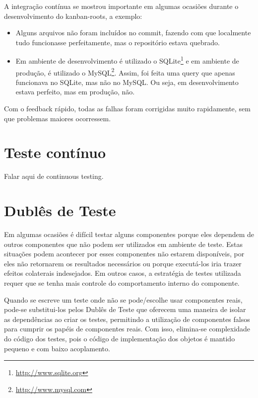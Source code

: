 A integração contínua se mostrou importante em algumas ocasiões durante o desenvolvimento do kanban-roots, a exemplo:

\begin{itemize}
  \item Alguns arquivos não foram incluídos no commit, fazendo com que localmente tudo funcionasse perfeitamente, mas o repositório estava quebrado.
  \item Em ambiente de desenvolvimento é utilizado o SQLite\footnote{\url{http://www.sqlite.org}} e em ambiente de produção, é utilizado o MySQL\footnote{\url{http://www.mysql.com}}. Assim, foi feita uma query que apenas funcionava no SQLite, mas não no MySQL. Ou seja, em desenvolvimento estava perfeito, mas em produção, não.
\end{itemize}

Com o feedback rápido, todas as falhas foram corrigidas muito rapidamente, sem que problemas maiores ocorressem.



\section{Teste contínuo}
\label{sub:teste_continuo}

Falar aqui de continuous testing.

\section{Dublês de Teste}

Em algumas ocasiões é difícil testar alguns componentes porque eles dependem de outros componentes que não podem ser utilizados em ambiente de teste. Estas situações podem acontecer por esses componentes não estarem disponíveis, por eles não retornarem os resultados necessários ou porque executá-los iria trazer efeitos colaterais indesejados. Em outros casos, a estratégia de testes utilizada requer que se tenha mais controle do comportamento interno do componente.

Quando se escreve um teste onde não se pode/escolhe usar componentes reais, pode-se substitui-los pelos Dublês de Teste que oferecem uma maneira de isolar as dependências ao criar os testes, permitindo a utilização de componentes falsos para cumprir os papéis de componentes reais. Com isso, elimina-se complexidade do código dos testes, pois o código de implementação dos objetos é mantido pequeno e com baixo acoplamento.

